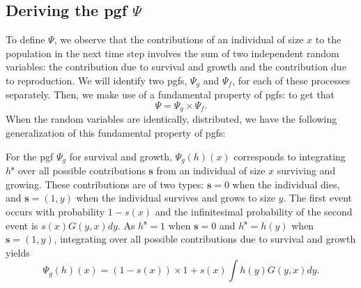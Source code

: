 \documentclass[12pt]{amsart}\usepackage[]{graphicx}\usepackage[]{color}
\def\s{\mathbf s}
\begin{document}
\subsection*{Deriving the pgf $\Psi$}

To define $\Psi$, we observe that the contributions of an individual of size $x$ to the population in the next time step involves the sum of two independent random variables:  the contribution due to survival and growth and the contribution due to reproduction. We will identify two pgfs, $\Psi_g$ and $\Psi_f$, for each of these processes separately. Then, we make use of a fundamental property of pgfs:\vskip 0.1in
\vskip 0.1in
to get that
\[
\Psi=\Psi_g \times \Psi_f.
\]
When the random variables are identically, distributed, we have the following generalization of this fundamental property of pgfs:
\vskip 0.1in
\vskip 0.1in


For the pgf $\Psi_g$ for survival and growth, $\Psi_g(h)(x)$ corresponds to integrating $h^\s$ over all possible contributions $\s$ from an individual of size $x$ surviving and growing. These contributions are of two types: $\s=0$ when the individual dies,  and $\s=(1,y)$ when the individual survives and grows to size $y$. The first event occurs with probability $1-s(x)$ and the infinitesimal probability of the second event is $s(x)G(y,x)dy$. As $h^\s=1$ when $\s=0$ and $h^\s=h(y)$ when $\s=(1,y)$, integrating over all possible contributions due to survival and growth yields
\[
\Psi_{g}(h)(x)=(1-s(x))\times 1 + s(x)\int h(y)G(y,x)dy.
\]
\end{document}

